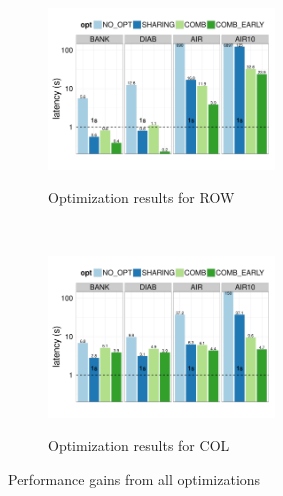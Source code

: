 \begin{figure}[h]
\vspace{-5pt}
	\centering
	\begin{subfigure}{1\linewidth}
		\centering
		{\includegraphics[width=6cm] {Images/all_opt_real_data_row.pdf}}
		\vspace{-15pt}
		\caption{Optimization results for ROW}
		\label{fig:share_prune_row}
	\end{subfigure}\\
	\begin{subfigure}{1\linewidth}
		\centering
		{\includegraphics[width=6cm] {Images/all_opt_real_data_col.pdf}}
		\vspace{-15pt}
		\caption{Optimization results for COL}
		\label{fig:share_prune_col}
	\end{subfigure}
	\vspace{-10pt}
	\caption{Performance gains from all optimizations}
	\label{fig:all_opt_with_pruning}
	\vspace{-15pt}
\end{figure}
 
